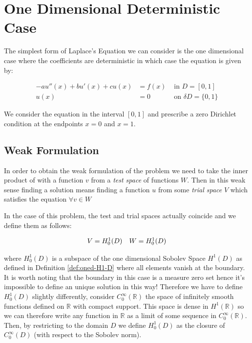 \chapter{One Dimensional Deterministic Case}\label{chap:oned-deterministic}

The simplest form of Laplace's Equation we can consider is the one dimensional
case where the coefficients are deterministic in which case the equation is
given by:

\begin{equation}\label{eq:oned-deterministic}
\begin{aligned}
    -au''(x) + bu'(x) + cu(x) &= f(x) &\text{ in } D = [0, 1] \\
                         u(x) &= 0 &\text{ on } \delta D = \{0, 1\}
\end{aligned}
\end{equation}

We consider the equation in the interval $[0,1]$ and prescribe a zero Dirichlet
condition at the endpoints $x = 0$ and $x = 1$.

\section{Weak Formulation}

In order to obtain the weak formulation of the problem we need to take the
inner product of  with a function $v$ from a
\textit{test space} of functions $W$. Then in this weak sense finding a
solution means finding a function $u$ from some \textit{trial space} $V$ which
satisfies the equation $\forall v\in W$

In the case of this problem, the test and trial spaces actually coincide and we
define them as follows:

\begin{equation}
    \begin{array}{c c}
        V = H^1_0(D) & W = H^1_0(D)
    \end{array}
\end{equation}

where $H^1_0(D)$ is a subspace of the one dimensional Sobolev Space $H^1(D)$ as
defined in Definition \ref{def:oned-H1-D} where all elements vanish at the
boundary. It is worth noting that the boundary in this case is a measure zero
set hence it's impossible to define an unique solution in this way! Therefore
we have to define $H^1_0(D)$ slightly differently, consider
$C^\infty_0(\mathbb{R})$ the space of infinitely smooth functions defined on
$\mathbb{R}$ with compact support. This space is dense in $H^1(\mathbb{R})$ so
we can therefore write any function in $\mathbb{R}$ as a limit of some sequence
in $C_0^\infty(\mathbb{R})$. Then, by restricting to the domain $D$ we define
$H^1_0(D)$ as the closure of $C_0^\infty(D)$ (with respect to the Sobolev
norm).

